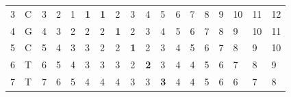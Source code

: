 \documentclass[times, utf8, zavrsni]{fer}
\begin{document}
\begin{table}[]
\begin{tabular}{|ll|llllllllllllllll|}
\multicolumn{1}{|l|}{3}  & C & \multicolumn{1}{l|}{3}          & \multicolumn{1}{l|}{2}          & \multicolumn{1}{l|}{1}          & \multicolumn{1}{l|}{\textbf{1}} & \multicolumn{1}{l|}{\textbf{1}} & \multicolumn{1}{l|}{2}          & \multicolumn{1}{l|}{3}          & \multicolumn{1}{l|}{4}          & \multicolumn{1}{l|}{5}          & \multicolumn{1}{l|}{6}          & \multicolumn{1}{l|}{7}          & \multicolumn{1}{l|}{8}          & \multicolumn{1}{l|}{9}          & \multicolumn{1}{l|}{10} & \multicolumn{1}{l|}{11} & 12 \\ \cline{3-18} 
\multicolumn{1}{|l|}{4}  & G & \multicolumn{1}{l|}{4}          & \multicolumn{1}{l|}{3}          & \multicolumn{1}{l|}{2}          & \multicolumn{1}{l|}{2}          & \multicolumn{1}{l|}{2}          & \multicolumn{1}{l|}{\textbf{1}} & \multicolumn{1}{l|}{2}          & \multicolumn{1}{l|}{3}          & \multicolumn{1}{l|}{4}          & \multicolumn{1}{l|}{5}          & \multicolumn{1}{l|}{6}          & \multicolumn{1}{l|}{7}          & \multicolumn{1}{l|}{8}          & \multicolumn{1}{l|}{9}  & \multicolumn{1}{l|}{10} & 11 \\ \cline{3-18} 
\multicolumn{1}{|l|}{5}  & C & \multicolumn{1}{l|}{5}          & \multicolumn{1}{l|}{4}          & \multicolumn{1}{l|}{3}          & \multicolumn{1}{l|}{3}          & \multicolumn{1}{l|}{2}          & \multicolumn{1}{l|}{2}          & \multicolumn{1}{l|}{\textbf{1}} & \multicolumn{1}{l|}{2}          & \multicolumn{1}{l|}{3}          & \multicolumn{1}{l|}{4}          & \multicolumn{1}{l|}{5}          & \multicolumn{1}{l|}{6}          & \multicolumn{1}{l|}{7}          & \multicolumn{1}{l|}{8}  & \multicolumn{1}{l|}{9}  & 10 \\ \cline{3-18} 
\multicolumn{1}{|l|}{6}  & T & \multicolumn{1}{l|}{6}          & \multicolumn{1}{l|}{5}          & \multicolumn{1}{l|}{4}          & \multicolumn{1}{l|}{3}          & \multicolumn{1}{l|}{3}          & \multicolumn{1}{l|}{3}          & \multicolumn{1}{l|}{2}          & \multicolumn{1}{l|}{\textbf{2}} & \multicolumn{1}{l|}{3}          & \multicolumn{1}{l|}{4}          & \multicolumn{1}{l|}{4}          & \multicolumn{1}{l|}{5}          & \multicolumn{1}{l|}{6}          & \multicolumn{1}{l|}{7}  & \multicolumn{1}{l|}{8}  & 9  \\ \cline{3-18} 
\multicolumn{1}{|l|}{7}  & T & \multicolumn{1}{l|}{7}          & \multicolumn{1}{l|}{6}          & \multicolumn{1}{l|}{5}          & \multicolumn{1}{l|}{4}          & \multicolumn{1}{l|}{4}          & \multicolumn{1}{l|}{4}          & \multicolumn{1}{l|}{3}          & \multicolumn{1}{l|}{3}          & \multicolumn{1}{l|}{\textbf{3}} & \multicolumn{1}{l|}{4}          & \multicolumn{1}{l|}{4}          & \multicolumn{1}{l|}{5}          & \multicolumn{1}{l|}{6}          & \multicolumn{1}{l|}{6}  & \multicolumn{1}{l|}{7}  & 8  \\ \cline{3-18} 

\end{tabular}
\end{table}
\end{document}
